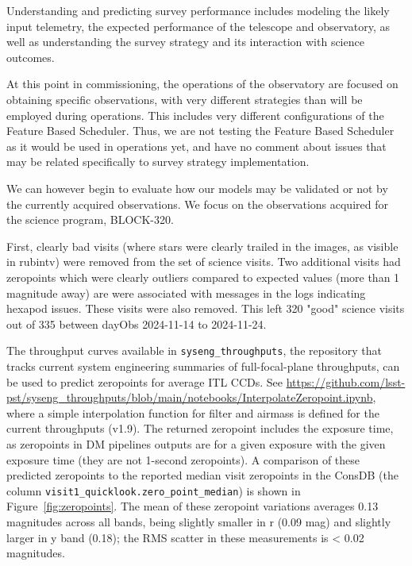 Understanding and predicting survey performance includes modeling the likely input telemetry, the expected performance of the telescope and observatory, as well as understanding the survey strategy and its interaction with science outcomes. 

At this point in commissioning, the operations of the observatory are focused on obtaining specific observations, with very different strategies than will be employed during operations. This includes very different configurations of the Feature Based Scheduler. Thus, we are not testing the Feature Based Scheduler as it would be used in operations yet, and have no comment about issues that may be related specifically to survey strategy implementation. 

We can however begin to evaluate how our models may be validated or not by the currently acquired observations. We focus on the observations acquired for the science program, BLOCK-320.

First, clearly bad visits (where stars were clearly trailed in the images, as visible in rubintv) were removed from the set of science visits. Two additional visits had zeropoints which were clearly outliers compared to expected values (more than 1 magnitude away) are were associated with messages in the logs indicating hexapod issues. These visits were also removed. This left 320 "good" science visits out of 335 between dayObs 2024-11-14 to 2024-11-24. 

The throughput curves available in \texttt{syseng\_throughputs}, the repository that tracks current system engineering summaries of full-focal-plane throughputs, can be used to predict zeropoints for average ITL CCDs. See \url{https://github.com/lsst-pst/syseng\_throughputs/blob/main/notebooks/InterpolateZeropoint.ipynb}, where a simple interpolation function for filter and airmass is defined for the current throughputs (v1.9). The returned zeropoint includes the exposure time, as zeropoints in DM pipelines outputs are for a given exposure with the given exposure time (they are not 1-second zeropoints). A comparison of these predicted zeropoints to the reported median visit zeropoints in the ConsDB (the column \texttt{visit1\_quicklook.zero\_point\_median}) is shown in Figure~\ref{fig:zeropoints}. The mean of these zeropoint variations averages 0.13 magnitudes across all bands, being slightly smaller in r (0.09 mag) and slightly larger in y band (0.18); the RMS scatter in these measurements is < 0.02 magnitudes. 



